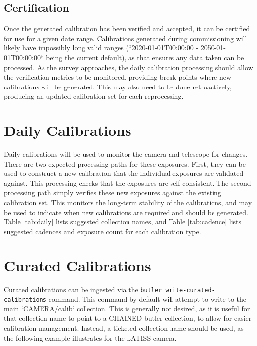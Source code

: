 \documentclass[DM,authoryear,toc]{lsstdoc}
\begin{document}
\subsection{Certification}

Once the generated calibration has been verified and accepted, it can be certified for use for a given date range.  Calibrations generated during commissioning will likely have impossibly long valid ranges (``2020-01-01T00:00:00 - 2050-01-01T00:00:00`` being the current default), as that ensures any data taken can be processed.  As the survey approaches, the daily calibration processing should allow the verification metrics to be monitored, providing break points where new calibrations will be generated.  This may also need to be done retroactively, producing an updated calibration set for each reprocessing.

\section{Daily Calibrations}

Daily calibrations will be used to monitor the camera and telescope for changes.  There are two expected processing paths for these exposures.  First, they can be used to construct a new calibration that the individual exposures are validated against.  This processing checks that the exposures are self consistent.  The second processing path simply verifies these new exposures against the existing calibration set.  This monitors the long-term stability of the calibrations, and may be used to indicate when new calibrations are required and should be generated.  Table \ref{tab:daily} lists suggested collection names, and Table \ref{tab:cadence} lists suggested cadences and exposure count for each calibration type.

\section{Curated Calibrations}

Curated calibrations can be ingested via the \verb|butler write-curated-calibrations| command.  This command by default will attempt to write to the main `CAMERA/calib` collection.  This is generally not desired, as it is useful for that collection name to point to a CHAINED butler collection, to allow for easier calibration management.  Instead, a ticketed collection name should be used, as the following example illustrates for the LATISS camera.
\end{document}
